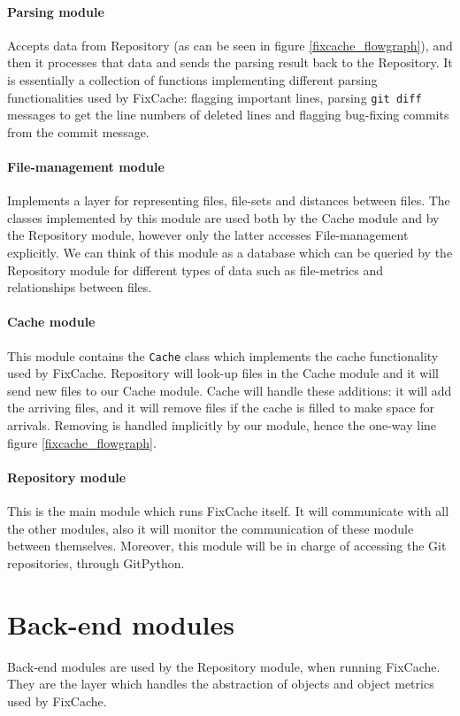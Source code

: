 \documentclass[12pt,twoside,notitlepage]{report}
\newcommand{\fxch}{FixCache}
\begin{document}
\paragraph{Parsing module}Accepts data from Repository (as can be seen in figure \ref{fixcache_flowgraph}), and then it processes that data and sends the parsing result back to the Repository. It is essentially a collection of functions implementing different parsing functionalities used by \fxch{}: flagging important lines, parsing \texttt{git diff} messages to get the line numbers of deleted lines and flagging bug-fixing commits from the commit message.

\paragraph{File-management module}Implements a layer for representing files, file-sets and distances between files. The classes implemented by this module are used both by the Cache module and by the Repository module, however only the latter accesses File-management explicitly. We can think of this module as a database which can be queried by the Repository module for different types of data such as file-metrics and relationships between files.

\paragraph{Cache module}This module contains the \texttt{Cache} class which implements the cache functionality used by \fxch{}. Repository will look-up files in the Cache module and it will send new files to our Cache module. Cache will handle these additions: it will add the arriving files, and it will remove files if the cache is filled to make space for arrivals. Removing is handled implicitly by our module, hence the one-way line figure \ref{fixcache_flowgraph}.

\paragraph{Repository module}This is the main module which runs \fxch{} itself. It will communicate with all the other modules, also it will monitor the communication of these module between themselves. Moreover, this module will be in charge of accessing the Git repositories, through GitPython.
\section{Back-end modules} Back-end modules are used by the Repository module, when running \fxch{}. They are the layer which handles the abstraction of objects and object metrics used by \fxch{}.
\end{document}
